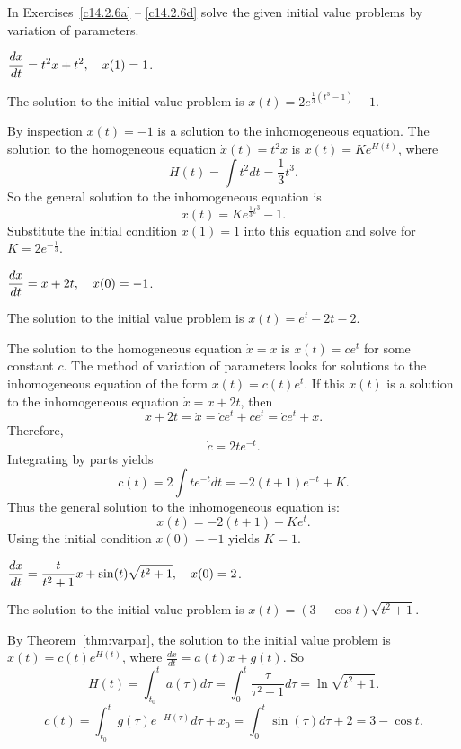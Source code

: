 \documentclass{ximera}
\begin{document}
\noindent In Exercises~\ref{c14.2.6a} -- \ref{c14.2.6d} solve the given 
initial value problems by variation of parameters.
\begin{exercise}   \label{c14.2.6a}
$\displaystyle \frac{dx}{dt} = t^2 x + t^2, \quad x(1)=1$.

\begin{solution}
\ans The solution to the initial value problem is
$x(t) = 2e^{\frac{1}{3}(t^3 - 1)} - 1$.

\soln By inspection $x(t) = -1$ is a solution to the inhomogeneous
equation.  The solution to the homogeneous equation $\dot{x}(t) = t^2x$ is
$x(t) = Ke^{H(t)}$, where
\[
H(t) = \int t^2dt = \frac{1}{3}t^3.
\]
So the general solution to the inhomogeneous equation is
\[
x(t) = Ke^{\frac{1}{3}t^3} - 1.
\]
Substitute the initial condition $x(1) = 1$ into this equation and
solve for $K = 2e^{-\frac{1}{3}}$.


\end{solution}
\end{exercise}
\begin{exercise}   \label{c14.2.6b}
$\displaystyle \frac{dx}{dt} = x+2t, \quad x(0)=-1$.

\begin{solution}
\ans The solution to the initial value problem is
$x(t) = e^t - 2t - 2$.

\soln The solution to the homogeneous equation $\dot{x}=x$ is $x(t)=ce^t$
for some constant $c$.  The method of variation of parameters looks for 
solutions to the inhomogeneous equation of the form $x(t)=c(t)e^t$.  If this 
$x(t)$ is a solution to the inhomogeneous equation $\dot{x}=x+2t$, then
\[
x+2t=\dot{x}=\dot{c}e^t+ce^t = \dot{c}e^t+x.
\]
Therefore,
\[
\dot{c} = 2te^{-t}.
\]
Integrating by parts yields
\[
c(t) = 2\int te^{-t}dt = -2(t+1)e^{-t} + K.
\]
Thus the general solution to the inhomogeneous equation is:
\[
x(t) = -2(t+1) + Ke^t.
\]
Using the initial condition $x(0)=-1$ yields $K=1$. 

\end{solution}
\end{exercise}
\begin{exercise}   \label{c14.2.6c}
$\displaystyle \frac{dx}{dt} = 
\frac{t}{t^2+1}x+\sin(t)\sqrt{t^2+1},\quad x(0)=2$.

\begin{solution}
\ans The solution to the initial value problem is
$x(t) = (3 - \cos t)\sqrt{t^2 + 1}$.

\soln By Theorem~\ref{thm:varpar}, the
solution to the initial value problem is $x(t) = c(t)e^{H(t)}$, where
$\frac{dx}{dt} = a(t)x + g(t)$.  So
\[
H(t) = \int_{t_0}^t a(\tau)d\tau = \int_0^t\frac{\tau}{\tau^2 + 1}d\tau
= \ln\sqrt{t^2 + 1}.
\]
\[
c(t) = \int_{t_0}^t g(\tau)e^{-H(\tau)}d\tau + x_0
= \int_0^t \sin(\tau)d\tau + 2
= 3 - \cos t.
\]

\end{solution}
\end{exercise}
\end{document}
